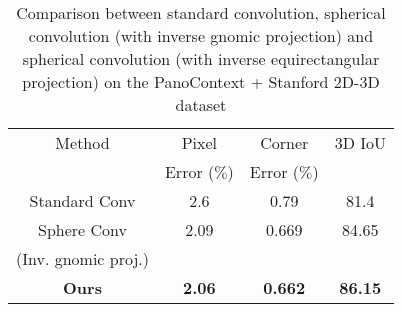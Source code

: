 \documentclass[final]{cvpr}
\begin{document}
\begin{table}[t]
\centering
 \begin{tabular}{||c c c c||} 
 \hline
 Method & Pixel & Corner & 3D IoU \\[0.5ex] 
 &Error ($\%$)&Error ($\%$)&\\[0.5ex]
 \hline\hline
 Standard Conv & 2.6 &  0.79 &  81.4 \\ [1ex] \hline
 Sphere Conv   & 2.09  &  0.669 & 84.65 \\[1ex]   
 (Inv. gnomic proj.)& &  & \\[1ex]
 \hline
 \textbf{Ours} & \textbf{2.06} & \textbf{0.662} & \textbf{86.15} \\ [1ex] 
 \hline
\end{tabular} \\~\\
\caption{Comparison between standard convolution, spherical convolution (with inverse gnomic projection) and spherical convolution (with inverse equirectangular projection) on the PanoContext \cite{zhang2014panocontext} + Stanford 2D-3D dataset \cite{armeni2017joint}}
\label{tab:Table6}
\end{table}
\end{document}
